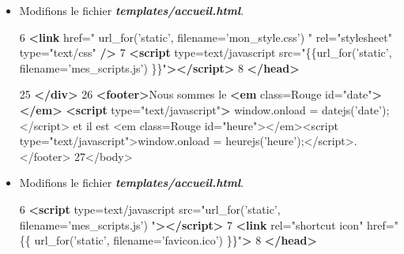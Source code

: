 \documentclass{article}
\newenvironment{Shaded}{}{}
\newcommand{\KeywordTok}[1]{\textcolor[rgb]{0.00,0.44,0.13}{\textbf{{#1}}}}
\newcommand{\DecValTok}[1]{\textcolor[rgb]{0.25,0.63,0.44}{{#1}}}
\newcommand{\StringTok}[1]{\textcolor[rgb]{0.25,0.44,0.63}{{#1}}}
\newcommand{\OtherTok}[1]{\textcolor[rgb]{0.00,0.44,0.13}{{#1}}}
\newcommand{\FunctionTok}[1]{\textcolor[rgb]{0.02,0.16,0.49}{{#1}}}
\newcommand{\NormalTok}[1]{{#1}}
\begin{document}
\begin{itemize}
\item
  Modifions le fichier \textbf{\emph{templates/accueil.html}}.

\begin{Shaded}
\begin{Highlighting}[]
 \NormalTok{6 }\KeywordTok{<link}\OtherTok{ href=}\StringTok{" url_for('static', filename='mon_style.css') "}\OtherTok{ rel=}\StringTok{"stylesheet"}\OtherTok{ type=}\StringTok{"text/css"} \KeywordTok{/>}
 \NormalTok{7 }\KeywordTok{<script}\OtherTok{ type=}\StringTok{text/javascript}\OtherTok{ src=}\StringTok{"\{\{url_for('static', filename='mes_scripts.js') \}\}"}\KeywordTok{></script>}
 \NormalTok{8 }\KeywordTok{</head>}
\end{Highlighting}
\end{Shaded}

\begin{Shaded}
\begin{Highlighting}[]
\NormalTok{25 }\KeywordTok{</div>}
\NormalTok{26 }\KeywordTok{<footer>}\NormalTok{Nous sommes le }\KeywordTok{<em}\OtherTok{ class=}\StringTok{Rouge}\OtherTok{ id=}\StringTok{"date"}\KeywordTok{></em>} \KeywordTok{<script}\OtherTok{ type=}\StringTok{"text/javascript"}\KeywordTok{>} \OtherTok{window}\NormalTok{.}\FunctionTok{onload} \NormalTok{= }\FunctionTok{datejs}\NormalTok{(}\StringTok{'date'}\NormalTok{);<}\OtherTok{/script> et il est <em class=Rouge id="heure"></em}\NormalTok{><script type=}\StringTok{"text/javascript"}\NormalTok{>}\OtherTok{window}\NormalTok{.}\FunctionTok{onload} \NormalTok{= }\FunctionTok{heurejs}\NormalTok{(}\StringTok{'heure'}\NormalTok{);<}\OtherTok{/script>.</footer}\NormalTok{>}
\DecValTok{27}\NormalTok{<}\OtherTok{/body>}
\end{Highlighting}
\end{Shaded}
\item
  Modifions le fichier \textbf{\emph{templates/accueil.html}}.

\begin{Shaded}
\begin{Highlighting}[]
 \NormalTok{6 }\KeywordTok{<script}\OtherTok{ type=}\StringTok{text/javascript}\OtherTok{ src=}\StringTok{"url_for('static', filename='mes_scripts.js') "}\KeywordTok{></script>}
 \NormalTok{7 }\KeywordTok{<link}\OtherTok{ rel=}\StringTok{"shortcut icon"}\OtherTok{ href=}\StringTok{"\{\{ url_for('static', filename='favicon.ico') \}\}"}\KeywordTok{>}
 \NormalTok{8 }\KeywordTok{</head>}
\end{Highlighting}
\end{Shaded}


\end{itemize}
\end{document}
